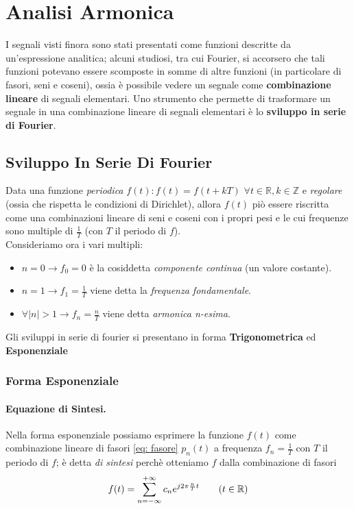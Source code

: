 \section{Analisi Armonica}
I segnali visti finora sono stati presentati come funzioni descritte da un'espressione analitica; alcuni studiosi, tra cui Fourier,
si accorsero che tali funzioni potevano essere scomposte in somme di altre funzioni (in particolare di fasori, seni e coseni), ossia
è possibile vedere un segnale come \textbf{combinazione lineare} di segnali elementari. Uno strumento che permette di trasformare
un segnale in una combinazione lineare di segnali elementari è lo \textbf{sviluppo in serie di Fourier}.

\subsection{Sviluppo In Serie Di Fourier}
Data una funzione \textit{periodica} $f(t) : f(t) = f(t + kT)$  $\forall t \in \mathbb{R}, k \in \mathbb{Z}$ e \textit{regolare}
(ossia che rispetta le condizioni di Dirichlet), allora $f(t)$ piò essere riscritta come una combinazioni lineare di seni e 
coseni con i propri pesi e le cui frequenze sono multiple di $\frac{1}{T}$ (con $T$ il periodo di $f$).\\

Consideriamo ora i vari multipli:
\begin{itemize}
    \item $n = 0 \longrightarrow f_0 = 0$ è la cosiddetta \textit{componente continua} (un valore costante).
    \item $n = 1 \longrightarrow f_1 = \frac{1}{T}$ viene detta la \textit{frequenza fondamentale}.
    \item $\forall |n| > 1 \longrightarrow f_n = \frac{n}{T}$ viene detta \textit{armonica n-esima}.
\end{itemize}

Gli sviluppi in serie di fourier si presentano in forma \textbf{Trigonometrica} ed \textbf{Esponenziale}

\subsubsection{Forma Esponenziale}
\paragraph{Equazione di Sintesi.}Nella forma esponenziale possiamo esprimere la funzione $f(t)$ come combinazione lineare di fasori \eqref{eq: fasore} $p_n(t)$ a
frequenza $f_n = \frac{1}{T}$ con $T$ il periodo di $f$; è detta \textit{di sintesi} perchè otteniamo $f$ dalla combinazione di fasori
\begin{equation}
    f(t) = \sum_{n = -\infty}^{+\infty} c_n e^{j2\pi \frac{n}{T} t}  \tag{$t \in \mathbb{R}$}
\end{equation}

